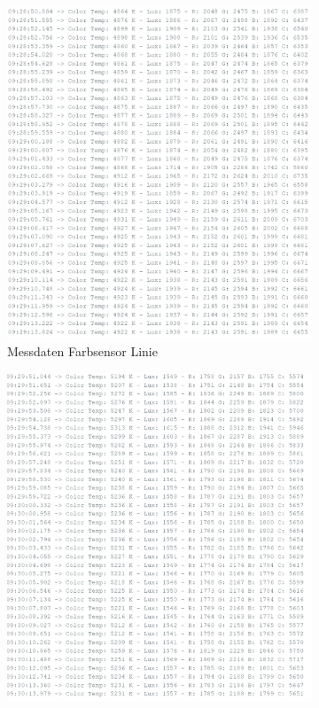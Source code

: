 \documentclass[../main.tex]{subfiles}
\begin{document}
\begin{figure}[H]
    \centering
    \begin{subfigure}{0.45\textwidth} %
        \centering
        \includegraphics[width=\linewidth]{img/sensortest/MD_Linie.png}
        \caption{Messdaten Farbsensor Linie}
        \label{fig:MDFarbsensorLinie}
    \end{subfigure}
    \begin{subfigure}{0.45\textwidth}
        \centering
        \includegraphics[width=\linewidth]{img/sensortest/MD_WeisserPunkt.png}

\end{subfigure}
\end{figure}
\end{document}
